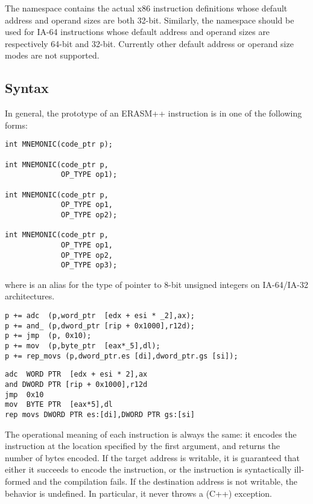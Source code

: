 \documentclass{article}
\begin{document}
The namespace  contains the actual
x86 instruction definitions whose default address and operand sizes
are both 32-bit.  Similarly, the namespace
 should be used for IA-64 instructions
whose default address and operand sizes are respectively 64-bit and
32-bit. Currently other default address or operand size modes are not
supported.

\subsection{Syntax}
\label{sec:syntax}

In general, the prototype of an ERASM++ instruction is in one of the following forms:

\begin{lstlisting}
int MNEMONIC(code_ptr p);

int MNEMONIC(code_ptr p,
             OP_TYPE op1);

int MNEMONIC(code_ptr p,
             OP_TYPE op1,
             OP_TYPE op2);

int MNEMONIC(code_ptr p,
             OP_TYPE op1,
             OP_TYPE op2,
             OP_TYPE op3);
\end{lstlisting}
\noindent where  is an alias for the type of
pointer to 8-bit unsigned integers on IA-64/IA-32 architectures.

\begin{lstlisting}[caption={Examples of ERASM++ instructions.},frame=single]
p += adc  (p,word_ptr  [edx + esi * _2],ax);
p += and_ (p,dword_ptr [rip + 0x1000],r12d);
p += jmp  (p, 0x10);
p += mov  (p,byte_ptr  [eax*_5],dl);
p += rep_movs (p,dword_ptr.es [di],dword_ptr.gs [si]);
\end{lstlisting}
\begin{lstlisting}[language={[x86masm]Assembler},caption={The corresponding MASM instructions.},frame=single]
adc  WORD PTR  [edx + esi * 2],ax
and DWORD PTR [rip + 0x1000],r12d
jmp  0x10
mov  BYTE PTR  [eax*5],dl
rep movs DWORD PTR es:[di],DWORD PTR gs:[si]
\end{lstlisting}

The operational meaning of each instruction is always the same: it
encodes the instruction at the location specified by the first
argument, and returns the number of bytes encoded. If the target
address is writable, it is guaranteed that either it succeeds to
encode the instruction, or the instruction is syntactically ill-formed
and the compilation fails. If the destination address is not writable,
the behavior is undefined. In particular, it never throws a (C++)
exception.
\end{document}
